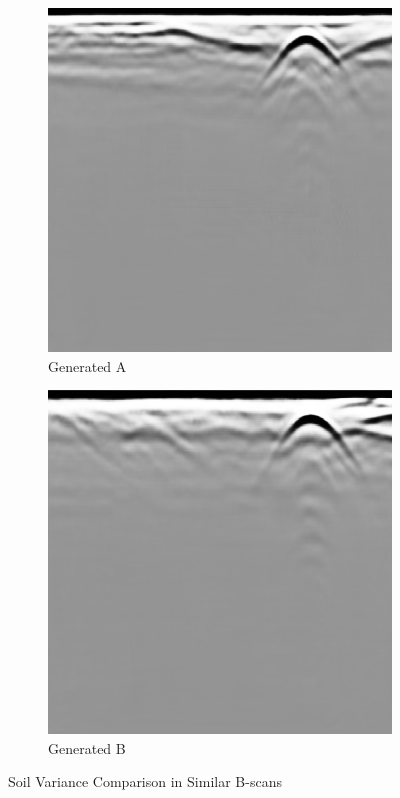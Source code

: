 \begin{figure}[H]
    \centering
    \begin{subfigure}[b]{0.4\linewidth}
    \includegraphics[width=\linewidth]{figures/high_res_gen.png}
    \caption{Generated A}
  \end{subfigure}
  \begin{subfigure}[b]{0.4\linewidth}
    \includegraphics[width=\linewidth]{figures/high_res_gan_comparison.png}
    \caption{Generated B}
  \end{subfigure}
  \caption{Soil Variance Comparison in Similar B-scans}
  \label{fig:hi_res_compare}
\end{figure}

